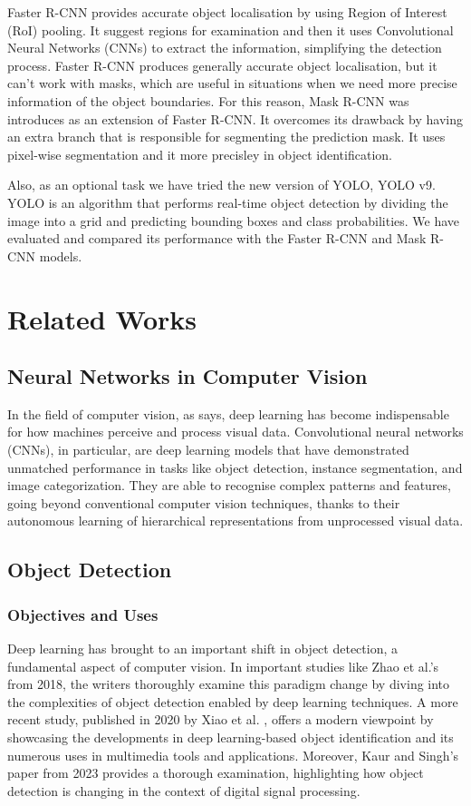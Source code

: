 \documentclass{IEEEtran}
\begin{document}
	Faster R-CNN provides accurate object localisation by using Region of Interest (RoI) pooling. It suggest regions for examination and then it uses Convolutional Neural Networks (CNNs) to extract the information, simplifying the detection process. Faster R-CNN produces generally accurate object localisation, but it can’t work with masks, which are useful in situations when we need more precise information of the object boundaries. For this reason, Mask R-CNN was introduces as an extension of Faster R-CNN. It overcomes its drawback by having an extra branch that is responsible for segmenting the prediction mask. It uses pixel-wise segmentation and it more precisley in object identification.
	
	Also, as an optional task we have tried the new version of YOLO, YOLO v9. YOLO is an algorithm that performs real-time object detection by  dividing the image into a grid and predicting bounding boxes and class probabilities. We have evaluated and compared its performance with the Faster R-CNN and Mask R-CNN models. 
	
	\section{Related Works}
	
	\subsection{Neural Networks in Computer Vision}
	In the field of computer vision, as \cite{DLinCVReview} says, deep learning has become indispensable for how machines perceive and process visual data. Convolutional neural networks (CNNs), in particular, are deep learning models that have demonstrated unmatched performance in tasks like object detection, instance segmentation, and image categorization. They are able to recognise complex patterns and features, going beyond conventional computer vision techniques, thanks to their autonomous learning of hierarchical representations from unprocessed visual data.
	
	\subsection{Object Detection}
	\subsubsection{Objectives and Uses}
	Deep learning has brought to an important shift in object detection, a fundamental aspect of computer vision. In important studies like Zhao et al.'s \cite{ObjDetReview} from 2018, the writers thoroughly examine this paradigm change by diving into the complexities of object detection enabled by deep learning techniques. A more recent study, published in 2020 by Xiao et al. \cite{ObjDetReview2}, offers a modern viewpoint by showcasing the developments in deep learning-based object identification and its numerous uses in multimedia tools and applications. Moreover, Kaur and Singh's paper \cite{ObjDetReview3} from 2023 provides a thorough examination, highlighting how object detection is changing in the context of digital signal processing. 
	
\end{document}
